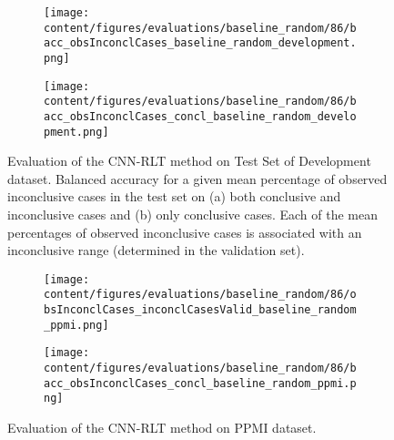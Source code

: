 \begin{figure}[t]
  \begin{subfigure}{0.9\textwidth}
    \centering
    \texttt{[image: content/figures/evaluations/baseline\_random/86/bacc\_obsInconclCases\_baseline\_random\_development.png]}
    \subcaption{}
    \label{fig:bacc_obsInconclCases_baseline_random_development}
  \end{subfigure}
  \hfill
  \begin{subfigure}{0.9\textwidth}
    \centering
    \texttt{[image: content/figures/evaluations/baseline\_random/86/bacc\_obsInconclCases\_concl\_baseline\_random\_development.png]}
    \subcaption{}
    \label{fig:bacc_obsInconclCases_concl_baseline_random_development}
  \end{subfigure}

  \caption{Evaluation of the CNN-RLT method on Test Set of Development dataset.
  Balanced accuracy for a given mean percentage of observed inconclusive cases in the test set on 
  (a) both conclusive and inconclusive cases and (b) only conclusive cases. 
  Each of the mean percentages of observed inconclusive cases is associated with an inconclusive range (determined in the validation set). }
  \label{fig:bacc_obsInconclCases_baseline_random_development_full}
\end{figure}




\begin{figure}[t]
  \begin{subfigure}{0.9\textwidth}
    \centering
    \texttt{[image: content/figures/evaluations/baseline\_random/86/obsInconclCases\_inconclCasesValid\_baseline\_random\_ppmi.png]}
    \label{fig:obsInconclCases_inconclCasesValid_baseline_random_ppmi}
  \end{subfigure}
  \hfill
  \begin{subfigure}{0.9\textwidth}
    \centering
    \texttt{[image: content/figures/evaluations/baseline\_random/86/bacc\_obsInconclCases\_concl\_baseline\_random\_ppmi.png]}
    \label{fig:bacc_obsInconclCases_concl_baseline_random_ppmi}
  \end{subfigure}
  \caption{Evaluation of the CNN-RLT method on PPMI dataset.}
\end{figure}



